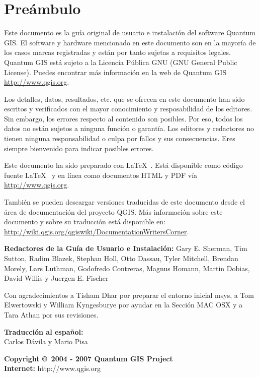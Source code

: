 \thispagestyle{empty}
\section*{Preámbulo}

\vspace{1cm}

Este documento es la guía original de usuario e instalación del 
software Quantum GIS. El software y hardware mencionado en este  
documento son en la mayoría de los casos marcas registradas y están por tanto sujetas  
a requisitos legales. Quantum GIS está sujeto a la Licencia Pública GNU (GNU General Public 
License). Puedes encontrar más información en la web de Quantum GIS \url{http://www.qgis.org}.

Los detalles, datos, resultados, etc. que se ofrecen en este documento han sido 
escritos y verificados con el mayor conocimiento y resposabilidad de los  
editores. Sin embargo, los errores respecto al contenido son posibles. 
Por eso, todos los datos no están sujetos a ninguna función o garantía. Los editores 
y redactores no tienen ninguna responsabilidad o culpa por fallos y  
sus consecuencias. Eres siempre bienvenido para indicar posibles errores.

Este documento ha sido preparado con \LaTeX~. Está disponible como código fuente \LaTeX~ 
 y en línea como documentos HTML y PDF vía \url{http://www.qgis.org}.

También se pueden descargar versiones traducidas de este documento desde el área de documentación 
del proyecto QGIS. Más información sobre este documento y sobre 
su traducción está disponible en: \\
\url{http://wiki.qgis.org/qgiswiki/DocumentationWritersCorner}. 

\begin{flushleft}
\textbf{Redactores de la Guía de Usuario e Instalación:} 
Gary E. Sherman, Tim Sutton, Radim Blazek, Stephan Holl, Otto Dassau, Tyler Mitchell, 
Brendan Morely, Lars Luthman, Godofredo Contreras, Magnus Homann, Martin Dobias, David Willis y Juergen E. Fischer

Con agradecimientos a Tisham Dhar por preparar el entorno inicial msys, a Tom 
Elwertowski y William Kyngesburye por ayudar en la Sección MAC OSX y a Tara 
Athan por sus revisiones.

\textbf{Traducción al español:}  \\
Carlos Dávila y Mario Pisa

\vspace{1cm}

\textbf{Copyright \copyright~2004 - 2007 Quantum GIS Project} \\
\textbf{Internet:} http://www.qgis.org
\end{flushleft}

